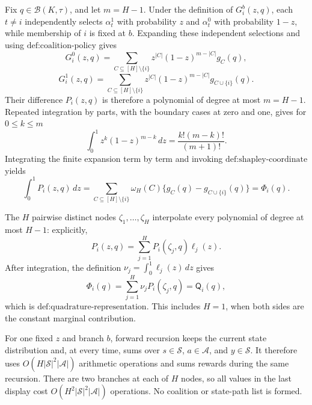 Fix \(q\in\mathcal B(K,\tau)\), and let \(m=H-1\).  Under the definition of \(G_i^b(z,q)\), each \(t\ne i\) independently selects \(\alpha_t^1\) with probability \(z\) and \(\alpha_t^0\) with probability \(1-z\), while membership of \(i\) is fixed at \(b\).  Expanding these independent selections and using \(\text{def:coalition-policy}\) gives
\[
 G_i^0(z,q)=\sum_{C\subseteq[H]\setminus\{i\}}
 z^{|C|}(1-z)^{m-|C|}g_C(q),
\]
\[
 G_i^1(z,q)=\sum_{C\subseteq[H]\setminus\{i\}}
 z^{|C|}(1-z)^{m-|C|}g_{C\cup\{i\}}(q).
\]
Their difference \(P_i(z,q)\) is therefore a polynomial of degree at most \(m=H-1\).  Repeated integration by parts, with the boundary cases at zero and one, gives for \(0\le k\le m\)
\[
 \int_0^1 z^k(1-z)^{m-k}\,dz
 =\frac{k!(m-k)!}{(m+1)!}.
\]
Integrating the finite expansion term by term and invoking \(\text{def:shapley-coordinate}\) yields
\[
 \int_0^1P_i(z,q)\,dz
 =\sum_{C\subseteq[H]\setminus\{i\}}
 \omega_H(C)\{g_C(q)-g_{C\cup\{i\}}(q)\}
 =\Phi_i(q).
\]

The \(H\) pairwise distinct nodes \(\zeta_1,\ldots,\zeta_H\) interpolate every polynomial of degree at most \(H-1\): explicitly,
\[
 P_i(z,q)=\sum_{j=1}^H P_i(\zeta_j,q)\ell_j(z).
\]
After integration, the definition \(\nu_j=\int_0^1\ell_j(z)\,dz\) gives
\[
 \Phi_i(q)=\sum_{j=1}^H\nu_jP_i(\zeta_j,q)=\mathsf Q_i(q),
\]
which is \(\text{def:quadrature-representation}\).  This includes \(H=1\), when both sides are the constant marginal contribution.

For one fixed \(z\) and branch \(b\), forward recursion keeps the current state distribution and, at every time, sums over \(s\in\mathcal S\), \(a\in\mathcal A\), and \(y\in\mathcal S\).  It therefore uses \(O(H|\mathcal S|^2|\mathcal A|)\) arithmetic operations and sums rewards during the same recursion.  There are two branches at each of \(H\) nodes, so all values in the last display cost \(O(H^2|\mathcal S|^2|\mathcal A|)\) operations.  No coalition or state-path list is formed.